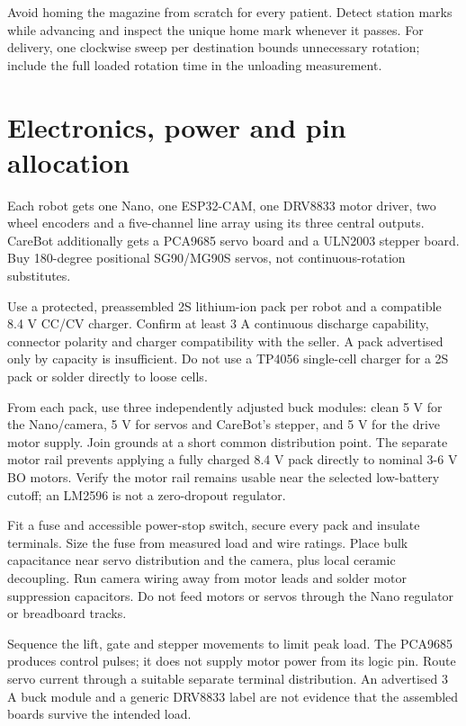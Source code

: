 \documentclass[10pt,a4paper]{article}
\begin{document}
Avoid homing the magazine from scratch for every patient. Detect station marks while advancing and inspect the unique home mark whenever it passes. For delivery, one clockwise sweep per destination bounds unnecessary rotation; include the full loaded rotation time in the unloading measurement.

\section{Electronics, power and pin allocation}
Each robot gets one Nano, one ESP32-CAM, one DRV8833 motor driver, two wheel encoders and a five-channel line array using its three central outputs. CareBot additionally gets a PCA9685 servo board and a ULN2003 stepper board. Buy 180-degree positional SG90/MG90S servos, not continuous-rotation substitutes.

Use a protected, preassembled 2S lithium-ion pack per robot and a compatible 8.4 V CC/CV charger. Confirm at least 3 A continuous discharge capability, connector polarity and charger compatibility with the seller. A pack advertised only by capacity is insufficient. Do not use a TP4056 single-cell charger for a 2S pack or solder directly to loose cells.

From each pack, use three independently adjusted buck modules: clean 5 V for the Nano/camera, 5 V for servos and CareBot's stepper, and 5 V for the drive motor supply. Join grounds at a short common distribution point. The separate motor rail prevents applying a fully charged 8.4 V pack directly to nominal 3-6 V BO motors. Verify the motor rail remains usable near the selected low-battery cutoff; an LM2596 is not a zero-dropout regulator.

Fit a fuse and accessible power-stop switch, secure every pack and insulate terminals. Size the fuse from measured load and wire ratings. Place bulk capacitance near servo distribution and the camera, plus local ceramic decoupling. Run camera wiring away from motor leads and solder motor suppression capacitors. Do not feed motors or servos through the Nano regulator or breadboard tracks.

Sequence the lift, gate and stepper movements to limit peak load. The PCA9685 produces control pulses; it does not supply motor power from its logic pin. Route servo current through a suitable separate terminal distribution. An advertised 3 A buck module and a generic DRV8833 label are not evidence that the assembled boards survive the intended load.
\end{document}
